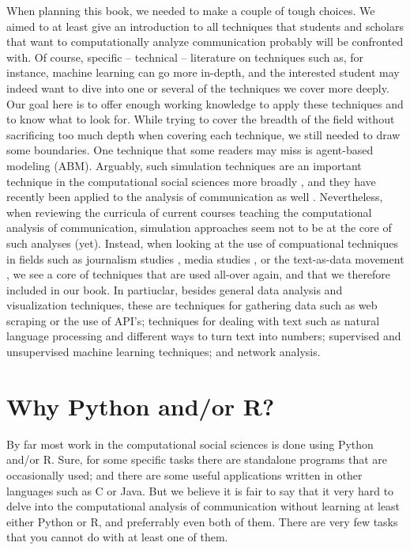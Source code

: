 When planning this book, we needed to make a couple of tough
choices. We aimed to at least give an introduction to all techniques
that students and scholars that want to computationally analyze
communication probably will be confronted with. Of course, specific --
technical -- literature on techniques such as, for instance, machine
learning can go more in-depth, and the interested student may indeed
want to dive into one or several of the techniques we cover more
deeply. Our goal here is to offer enough working knowledge to apply
these techniques and to know what to look for.  While trying to cover
the breadth of the field without sacrificing too much depth when
covering each technique, we still needed to draw some boundaries. One
technique that some readers may miss is agent-based modeling
(ABM). Arguably, such simulation techniques are an important technique
in the computational social sciences more broadly
\citep{cioffi-revilla2014}, and they have recently been applied to the
analysis of communication as well
\citep{Waldherr2014,Wettstein2020}. Nevertheless, when reviewing the
curricula of current courses teaching the computational analysis of
communication, simulation approaches seem not to be at the core of
such analyses (yet).  Instead, when looking at the use of compuational
techniques in fields such as journalism studies
\citep[e.g.,][]{Boumans2016}, media studies \citep[e.g.,][]{Rieder2017}, or
the text-as-data movement \citep{Grimmer2013}, we see a core of
techniques that are used all-over again, and that we therefore
included in our book. In partiuclar, besides general data analysis and visualization techniques,
these are techniques for
gathering data such as web scraping or the use of API's; techniques
for dealing with text such as natural language processing and
different ways to turn text into numbers; supervised and unsupervised
machine learning techniques; and network analysis.



\section{Why Python and/or R?}
By far most work in the computational social sciences is done using
Python and/or R. Sure, for some specific tasks there are standalone
programs that are occasionally used; and there are some useful applications
written in other languages such as C or Java. But we believe it is
fair to say that it very hard to delve into the computational analysis
of communication without learning at least either Python or R, and
preferrably even both of them.
There are very few tasks that you cannot do with at least one of them.

